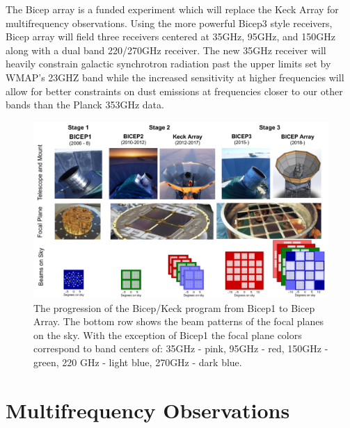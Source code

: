 \documentclass[12pt]{article}
\begin{document}
The Bicep array is a funded experiment which will replace the Keck Array for
multifrequency observations. Using the more powerful Bicep3 style receivers,
Bicep array will field three receivers centered at 35GHz, 95GHz, and 150GHz
along with a dual band 220/270GHz receiver. The new 35GHz receiver will
heavily constrain galactic synchrotron radiation past the upper limits set by
WMAP's 23GHZ band while the increased sensitivity at higher frequencies will
allow for better constraints on dust emissions at frequencies closer to our
other bands than the Planck 353GHz data.


\begin{figure}
	\center
	\includegraphics[width=.8\textwidth]{BK_progression.png}
	\caption{The progression of the Bicep/Keck program from Bicep1 to Bicep
	Array. The bottom row shows the beam patterns of the focal planes on the
	sky. With the exception of Bicep1 the focal plane colors correspond to
	band centers of: 35GHz - pink, 95GHz - red, 150GHz - green, 220 GHz -
	light blue, 270GHz - dark blue.}
	\label{fig:BK_progression}
\end{figure}




\section{Multifrequency Observations}
\end{document}
